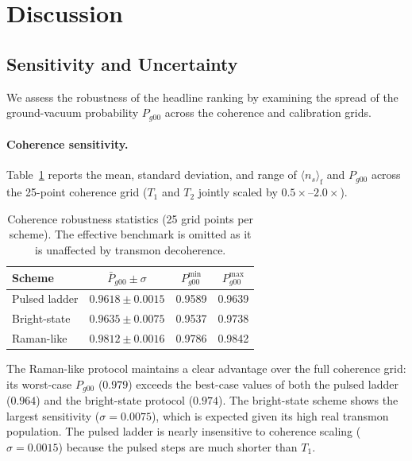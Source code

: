 \documentclass[aps,pra,twocolumn,reprint,floatfix,amsmath,amssymb]{revtex4-2}
\begin{document}
\section{Discussion}
\label{sec:discussion}

\subsection{Sensitivity and Uncertainty}

We assess the robustness of the headline ranking by examining the spread of the ground-vacuum probability $P_{g00}$ across the coherence and calibration grids.

\paragraph{Coherence sensitivity.}
Table~\ref{tab:coherence_sensitivity} reports the mean, standard deviation, and range of $\langle n_s\rangle_{\mathrm{f}}$ and $P_{g00}$ across the 25-point coherence grid ($T_1$ and $T_2$ jointly scaled by $0.5{\times}$--$2.0{\times}$).

\begin{table}[t]
\caption{Coherence robustness statistics (25 grid points per scheme). The effective benchmark is omitted as it is unaffected by transmon decoherence.}
\label{tab:coherence_sensitivity}
\begin{tabular}{lccc}
\toprule
Scheme & $\bar{P}_{g00} \pm \sigma$ & $P_{g00}^{\min}$ & $P_{g00}^{\max}$ \\
\midrule
Pulsed ladder   & $0.9618 \pm 0.0015$ & 0.9589 & 0.9639 \\
Bright-state    & $0.9635 \pm 0.0075$ & 0.9537 & 0.9738 \\
Raman-like      & $0.9812 \pm 0.0016$ & 0.9786 & 0.9842 \\
\bottomrule
\end{tabular}
\end{table}

The Raman-like protocol maintains a clear advantage over the full coherence grid: its worst-case $P_{g00}$ ($0.979$) exceeds the best-case values of both the pulsed ladder ($0.964$) and the bright-state protocol ($0.974$).
The bright-state scheme shows the largest sensitivity ($\sigma = 0.0075$), which is expected given its high real transmon population.
The pulsed ladder is nearly insensitive to coherence scaling ($\sigma = 0.0015$) because the pulsed steps are much shorter than $T_1$.
\end{document}
